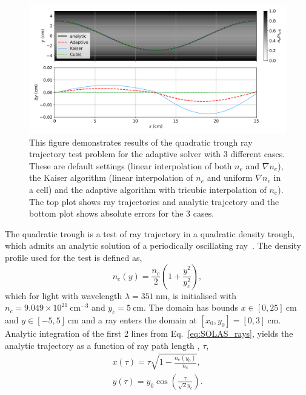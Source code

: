 \begin{figure}[t!]
    \includegraphics[width=\linewidth]{Numerics/Images/Quadtrough.png}
    \centering
    \caption{This figure demonstrates results of the quadratic trough ray trajectory test problem for the adaptive solver with 3 different cases.
    These are default settings (linear interpolation of both $n_e$ and $\nabla n_e$), the Kaiser algorithm (linear interpolation of $n_e$ and uniform $\nabla n_e$ in a cell) and the adaptive algorithm with tricubic interpolation of $n_e$).
    The top plot shows ray trajectories and analytic trajectory and the bottom plot shows absolute errors for the 3 cases.}%
    \label{fig:SOLAS_quadtrough}
\end{figure}

The quadratic trough is a test of ray trajectory in a quadratic density trough, which admits an analytic solution of a periodically oscillating ray~\cite{kaiser_laser_2000,haines_coupling_2020}.
The density profile used for the test is defined as,
\begin{equation}
    n_e(y) = \frac{n_c}{2} \left( 1 + \frac{y^2}{y_c^2} \right),
\end{equation}
which for light with wavelength $\lambda=351\ \text{nm}$, is initialised with $n_c = 9.049\times 10^{21} \ \text{cm}^{-3}$ and $y_c = 5 \ \text{cm}$.
The domain has bounds $x \in [0,25]\ \text{cm}$ and $y \in [-5,5]\ \text{cm}$ and a ray enters the domain at $[x_0,y_0]=[0,3]\ \text{cm}$.
Analytic integration of the first 2 lines from Eq.~\ref{eq:SOLAS_rays}, yields the analytic trajectory as a function of ray path length , $\tau$,
\begin{equation}
    \begin{gathered}
        x(\tau) = \tau\sqrt{1-\frac{n_e(y_0)}{n_c}}, \\
        y(\tau) = y_0\cos{\left( \frac{\tau}{\sqrt{2}y_c} \right)}.
    \end{gathered}
\end{equation}

